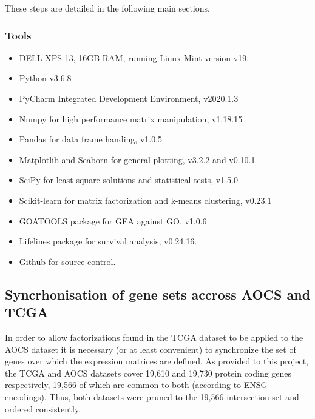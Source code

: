 \documentclass[tikz, 12pt,a4paper,oneside,fleqn]{article}
\begin{document}
These steps are detailed in the following main sections.

\FloatBarrier

\subsubsection{Tools}
\begin{itemize}
\itemsep -0.5em 
\item DELL XPS 13, 16GB RAM, running Linux Mint version v19.
\item Python v3.6.8
\item PyCharm Integrated Development Environment, v2020.1.3
\item Numpy for high performance matrix manipulation, v1.18.15
\item Pandas for data frame handing, v1.0.5
\item Matplotlib and Seaborn for general plotting, v3.2.2 and v0.10.1
\item SciPy for least-square solutions and statistical tests, v1.5.0
\item Scikit-learn for matrix factorization and k-means clustering, v0.23.1
\item GOATOOLS package for GEA against GO, v1.0.6
\item Lifelines package for survival analysis, v0.24.16.
\item Github for source control.
\end{itemize}

\subsection{Syncrhonisation of gene sets accross AOCS and TCGA}
\label{sec:gene-set-intersection}

In order to allow factorizations found in the TCGA dataset to be applied to the AOCS dataset it is necessary (or at least convenient) to synchronize the set of genes over which the expression matrices are defined.   As provided to this project, the TCGA and AOCS datasets cover 19,610 and 19,730 protein coding genes respectively, 19,566 of which are common to both (according to ENSG encodings).  Thus, both datasets were pruned to the 19,566 intersection set and ordered consistently.
\end{document}
